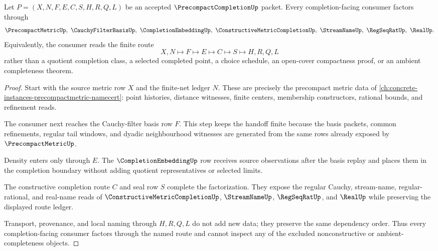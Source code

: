 \begin{theorem}
\label{thm:precompact-completion-density-handoff}
Let $P=(X,N,F,E,C,S,H,R,Q,L)$ be an accepted $\PrecompactCompletionUp$ packet. Every completion-facing consumer factors through
$$
\PrecompactMetricUp,\ \CauchyFilterBasisUp,\ \CompletionEmbeddingUp,\ \ConstructiveMetricCompletionUp,\ \StreamNameUp,\ \RegSeqRatUp,\ \RealUp .
$$
Equivalently, the consumer reads the finite route
$$
X,N \longmapsto F \longmapsto E \longmapsto C \longmapsto S \longmapsto H,R,Q,L
$$
rather than a quotient completion class, a selected completed point, a choice schedule, an open-cover compactness proof, or an ambient completeness theorem.
\end{theorem}
\begin{proof}
Start with the source metric row $X$ and the finite-net ledger $N$. These are precisely the precompact metric data of \autoref{ch:concrete-instances-precompactmetric-namecert}: point histories, distance witnesses, finite centers, membership constructors, rational bounds, and refinement reads.

The consumer next reaches the Cauchy-filter basis row $F$. This step keeps the handoff finite because the basis packets, common refinements, regular tail windows, and dyadic neighbourhood witnesses are generated from the same rows already exposed by $\PrecompactMetricUp$.

Density enters only through $E$. The $\CompletionEmbeddingUp$ row receives source observations after the basis replay and places them in the completion boundary without adding quotient representatives or selected limits.

The constructive completion route $C$ and seal row $S$ complete the factorization. They expose the regular Cauchy, stream-name, regular-rational, and real-name reads of $\ConstructiveMetricCompletionUp$, $\StreamNameUp$, $\RegSeqRatUp$, and $\RealUp$ while preserving the displayed route ledger.

Transport, provenance, and local naming through $H,R,Q,L$ do not add new data; they preserve the same dependency order. Thus every completion-facing consumer factors through the named route and cannot inspect any of the excluded nonconstructive or ambient-completeness objects.
\end{proof}

